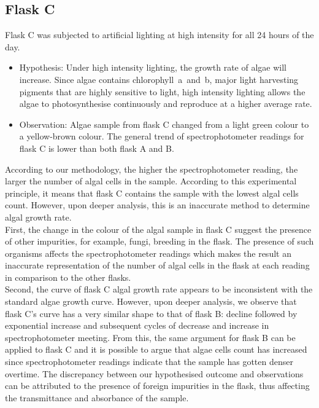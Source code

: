 \documentclass[12pt,a4paper]{IEEEtran}
\begin{document}
    \subsection{Flask C}
    Flask C was subjected to artificial lighting at high intensity for all 24 hours of the day. \\
    
    \begin{itemize}
    	\item Hypothesis: Under high intensity lighting, the growth rate of algae will increase. Since algae contains chlorophyll~a~and~b, major light harvesting pigments that are highly sensitive to light, high intensity lighting allows the algae to photosynthesise continuously and reproduce at a higher average rate. \\
    	\item Observation: Algae sample from flask C changed from a light green colour to a yellow-brown colour. The general trend of spectrophotometer readings for flask C is lower than both flask A and B. \\
    \end{itemize}
    According to our methodology, the higher the spectrophotometer reading, the larger the number of algal cells in the sample. According to this experimental principle, it means that flask C contains the sample with the lowest algal cells count. However, upon deeper analysis, this is an inaccurate method to determine algal growth rate. \\
    
    First, the change in the colour of the algal sample in flask C suggest the presence of other impurities, for example, fungi, breeding in the flask. The presence of such organisms affects the spectrophotometer readings which makes the result an inaccurate representation of the number of algal cells in the flask at each reading in comparison to the other flasks. \\
    
    Second, the curve of flask C algal growth rate appears to be inconsistent with the standard algae growth curve. However, upon deeper analysis, we observe that flask C's curve has a very similar shape to that of flask B: decline followed by exponential increase and subsequent cycles of decrease and increase in spectrophotometer meeting. From this, the same argument for flask B can be applied to flask C and it is possible to argue that algae cells count has increased since spectrophotometer readings indicate that the sample has gotten denser overtime. The discrepancy between our hypothesised outcome and observations can be attributed to the presence of foreign impurities in the flask, thus affecting the transmittance and absorbance of the sample. \\ \vspace{-0.1in}
    
\end{document}
